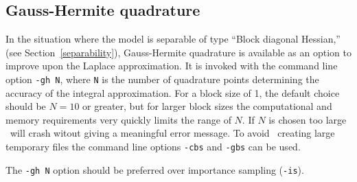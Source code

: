 \documentclass{admbmanual}
\begin{document}
\subsection{Gauss-Hermite quadrature}

In the situation where the model is separable of type ``Block diagonal
Hessian,'' (see Section~\ref{separability}), Gauss-Hermite quadrature is
available as an option to improve upon the Laplace approximation. It is invoked
with the command line option \texttt{-gh N}, where \texttt{N} is the number of
quadrature points determining the accuracy of the integral approximation. For a
block size of 1, the default choice should be $N=10$ or greater, but for larger
block sizes the computational and memory requirements very quickly limits the
range of $N$. If $N$ is chosen too large \scAR\ will crash witout giving a
meaningful error message. To avoid \scAR\ creating large temporary files the
command line options \texttt{-cbs} and \texttt{-gbs} can be used.

The \texttt{-gh N} option should be preferred over importance sampling
(\texttt{-is}).
\end{document}
